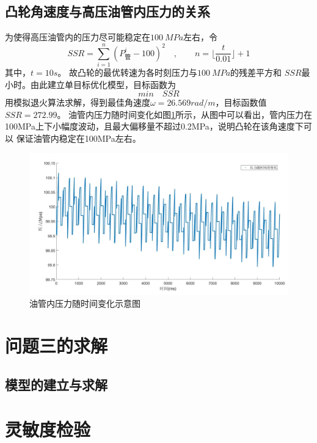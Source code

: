 \documentclass[withoutpreface,bwprint]{cumcmthesis} %
\begin{document}
\subsection{凸轮角速度与高压油管内压力的关系}
    为使得高压油管内的压力尽可能稳定在$100~MPa$左右，令
    \begin{equation}
        SSR=\sum\limits_{i=1}^n (P_{\text{管}}^i-100)^2
        \quad , \quad \quad n={\lfloor{\frac{t}{0.01}}\rfloor+1}
    \label{equ52}
    \end{equation}
    其中，$t=10s$。
    故凸轮的最优转速为各时刻压力与$100~MPa$的残差平方和
    $SSR$最小时。由此建立单目标优化模型，目标函数为
    \begin{equation}
       min \quad SSR
    \label{equ53}
    \end{equation}
    用模拟退火算法求解，得到最佳角速度$\omega=26.569rad/m$，目标函数值$SSR=272.99$。
    油管内压力随时间变化如图\ref{figure13}所示，从图中可以看出，管内压力在
    100MPa上下小幅度波动，且最大偏移量不超过0.2MPa，说明凸轮在该角速度下可以
    保证油管内稳定在100MPa左右。
    \begin{figure}[!h]
    \centering
    \includegraphics[width=.95\textwidth]{q2_10s.jpg}
    \caption{油管内压力随时间变化示意图}
    \label{figure13}
    \end{figure}

\section{问题三的求解}

\subsection{模型的建立与求解}



\section{灵敏度检验}
\end{document}
